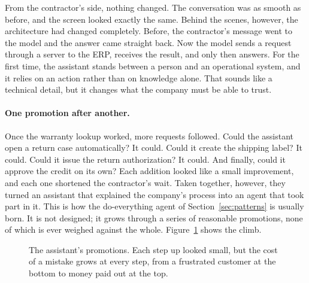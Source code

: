 From the contractor's side, nothing changed. The conversation was as smooth as before, and the screen looked exactly the same. Behind the scenes, however, the architecture had changed completely. Before, the contractor's message went to the model and the answer came straight back. Now the model sends a request through a server to the ERP, receives the result, and only then answers. For the first time, the assistant stands between a person and an operational system, and it relies on an action rather than on knowledge alone. That sounds like a technical detail, but it changes what the company must be able to trust.

\paragraph{One promotion after another.} Once the warranty lookup worked, more requests followed. Could the assistant open a return case automatically? It could. Could it create the shipping label? It could. Could it issue the return authorization? It could. And finally, could it approve the credit on its own? Each addition looked like a small improvement, and each one shortened the contractor's wait. Taken together, however, they turned an assistant that explained the company's process into an agent that took part in it. This is how the do-everything agent of Section~\ref{sec:patterns} is usually born. It is not designed; it grows through a series of reasonable promotions, none of which is ever weighed against the whole. Figure~\ref{fig:promotions} shows the climb.

\begin{figure}[htbp]
\centering
{}
\caption{The assistant's promotions. Each step up looked small, but the cost of a mistake grows at every step, from a frustrated customer at the bottom to money paid out at the top.}
\label{fig:promotions}
\end{figure}


